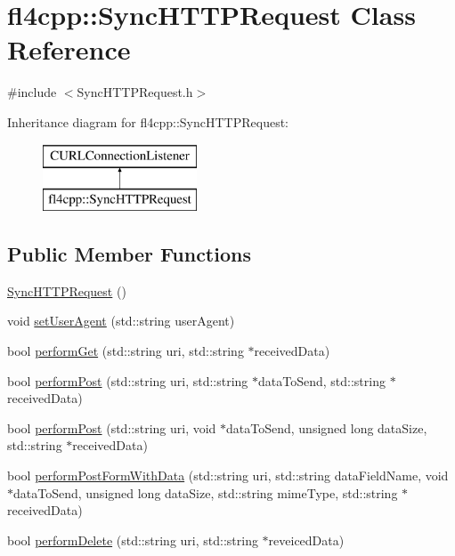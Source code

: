 \hypertarget{classfl4cpp_1_1_sync_h_t_t_p_request}{}\section{fl4cpp\+:\+:Sync\+H\+T\+T\+P\+Request Class Reference}
\label{classfl4cpp_1_1_sync_h_t_t_p_request}


{\ttfamily \#include $<$Sync\+H\+T\+T\+P\+Request.\+h$>$}

Inheritance diagram for fl4cpp\+:\+:Sync\+H\+T\+T\+P\+Request\+:\begin{figure}[H]
\begin{center}
\leavevmode
\includegraphics[height=2.000000cm]{classfl4cpp_1_1_sync_h_t_t_p_request}
\end{center}
\end{figure}
\subsection*{Public Member Functions}
\begin{DoxyCompactItemize}
\item 
\hyperlink{classfl4cpp_1_1_sync_h_t_t_p_request_a4c1591ce1cce84fc3ff848b8eb355c8c}{Sync\+H\+T\+T\+P\+Request} ()
\item 
void \hyperlink{classfl4cpp_1_1_sync_h_t_t_p_request_a287a1972c4275a135bfa70a299b38537}{set\+User\+Agent} (std\+::string user\+Agent)
\item 
bool \hyperlink{classfl4cpp_1_1_sync_h_t_t_p_request_afa3d30cb041955b07326e1e6cc028548}{perform\+Get} (std\+::string uri, std\+::string $\ast$received\+Data)
\item 
bool \hyperlink{classfl4cpp_1_1_sync_h_t_t_p_request_a646f8b9fbab75d255eec00b050f795b4}{perform\+Post} (std\+::string uri, std\+::string $\ast$data\+To\+Send, std\+::string $\ast$received\+Data)
\item 
bool \hyperlink{classfl4cpp_1_1_sync_h_t_t_p_request_a373d73f8d9e7bb7926941e67c9013682}{perform\+Post} (std\+::string uri, void $\ast$data\+To\+Send, unsigned long data\+Size, std\+::string $\ast$received\+Data)
\item 
bool \hyperlink{classfl4cpp_1_1_sync_h_t_t_p_request_a81c2e30c54226a3da18f3a0eb2117ba5}{perform\+Post\+Form\+With\+Data} (std\+::string uri, std\+::string data\+Field\+Name, void $\ast$data\+To\+Send, unsigned long data\+Size, std\+::string mime\+Type, std\+::string $\ast$received\+Data)
\item 
bool \hyperlink{classfl4cpp_1_1_sync_h_t_t_p_request_ac27f19d6ac4cd66ba38fd2bec88ff5ec}{perform\+Delete} (std\+::string uri, std\+::string $\ast$reveiced\+Data)
\end{DoxyCompactItemize}
